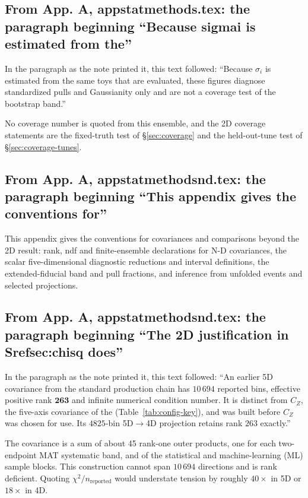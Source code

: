 \subsection{From App. A, appstatmethods.tex: the paragraph beginning ``Because sigmai is estimated from the''}
In the paragraph as the note printed it, this text followed: ``Because $\sigma_i$ is estimated from the same toys that are evaluated, these figures diagnose standardized pulls and Gaussianity only and are not a coverage test of the bootstrap band.''\par
No coverage number is quoted from this ensemble, and the 2D coverage statements are the fixed-truth test of \S\ref{sec:coverage} and the held-out-tune test of \S\ref{sec:coverage-tunes}.

\subsection{From App. A, appstatmethodsnd.tex: the paragraph beginning ``This appendix gives the conventions for''}
This appendix gives the conventions for covariances and comparisons beyond the 2D result: rank, ndf and finite-ensemble declarations for N-D covariances, the scalar five-dimensional diagnostic reductions and interval definitions, the extended-fiducial band and pull fractions, and inference from unfolded events and selected projections.



\subsection{From App. A, appstatmethodsnd.tex: the paragraph beginning ``The 2D justification in Srefsec:chisq does''}
In the paragraph as the note printed it, this text followed: ``An earlier 5D covariance from the standard production chain has $10\,694$ reported bins, effective positive rank $\mathbf{263}$ and infinite numerical condition number. It is distinct from $C_Z$, the five-axis covariance of the \resFiveAxis{} (Table~\ref{tab:config-key}), and was built before $C_Z$ was chosen for use. Its $4825$-bin 5D$\to$4D projection retains rank $263$ exactly.''\par
The covariance is a sum of about 45 rank-one outer products, one for each two-endpoint MAT systematic band, and of the statistical and machine-learning (ML) sample blocks. This construction cannot span $10\,694$ directions and is rank deficient. Quoting $\chi^{2}/n_{\text{reported}}$ would understate tension by roughly $40\times$ in 5D or $18\times$ in 4D.

